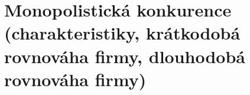\clearpage
\section{Monopolistická konkurence (charakteristiky, krátkodobá rovnováha firmy,
dlouhodobá rovnováha firmy)}